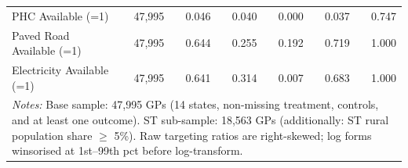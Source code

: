 \begin{table}[htbp]
\begin{tabular}{lrrrrrr}
PHC Available (=1) & 47,995 & 0.046 & 0.040 & 0.000 & 0.037 & 0.747 \\
Paved Road Available (=1) & 47,995 & 0.644 & 0.255 & 0.192 & 0.719 & 1.000 \\
Electricity Available (=1) & 47,995 & 0.641 & 0.314 & 0.007 & 0.683 & 1.000 \\
\hline\hline
\multicolumn{7}{p{14cm}}{\footnotesize \textit{Notes:} Base sample: 47,995 GPs (14 states, non-missing treatment, controls, and at least one outcome). ST sub-sample: 18,563 GPs (additionally: ST rural population share $\geq$ 5\%). Raw targeting ratios are right-skewed; log forms winsorised at 1st--99th pct before log-transform.}
\end{tabular}
\end{table}